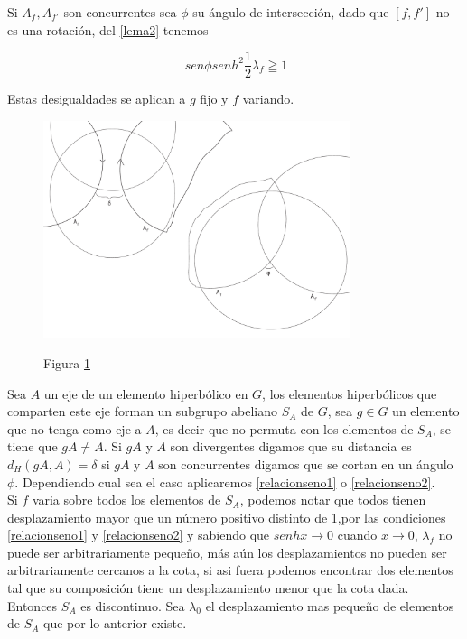 Si $A_{f},A_{f'}$ son concurrentes sea $\phi$ su \'angulo de
intersecci\'on, dado que $[f,f']$ no es una rotaci\'on,  del
\ref{lema2} tenemos

\begin{equation} \label{relacionseno2}
 \ sen \phi senh^{2}\frac{1}{2} \lambda_{f} \geqq 1
\end{equation}

Estas desigualdades se aplican a $g$ fijo y $f$ variando.



\begin{figure}[h]
  \centering
  \includegraphics[width=9cm]{lemma6-dibujo-2-4}\\
  \caption{Figura \ref{lemma6-dibujo-2-4}}\label{lemma6-dibujo-2-4}
\end{figure}


Sea $A$ un eje de un elemento hiperb\'olico en $G$, los elementos
hiperb\'olicos que comparten este eje forman un subgrupo abeliano
$S_{A}$ de $G$, sea $g \in G$ un elemento que no tenga como eje a
$A$, es decir que no permuta con los elementos de $S_{A}$, se tiene
que $gA \neq A$. Si $gA$ y $A$ son divergentes digamos que su distancia es $d_{H}(gA,A)= \delta$
si $gA$ y $A$ son concurrentes digamos que se cortan en un \'angulo $\phi$. Dependiendo cual sea el caso aplicaremos \ref{relacionseno1} o \ref{relacionseno2}. \\


Si $f$ varia sobre todos los elementos de $S_{A}$, podemos notar que
todos tienen desplazamiento mayor que un n\'umero positivo distinto
de 1,por las condiciones \ref{relacionseno1} y \ref{relacionseno2} y sabiendo que $senhx \rightarrow 0$ cuando $x \rightarrow 0 $, $\lambda_{f}$ no puede ser arbitrariamente pequeño, m\'as a\'un los desplazamientos no pueden ser arbitrariamente cercanos a la cota, si asi fuera podemos encontrar dos elementos tal que su composici\'on tiene un desplazamiento menor que la cota dada. Entonces $S_{A}$ es discontinuo. Sea $\lambda_{0}$ el desplazamiento mas pequeño de elementos de $S_{A}$ que por lo anterior existe.  \\

